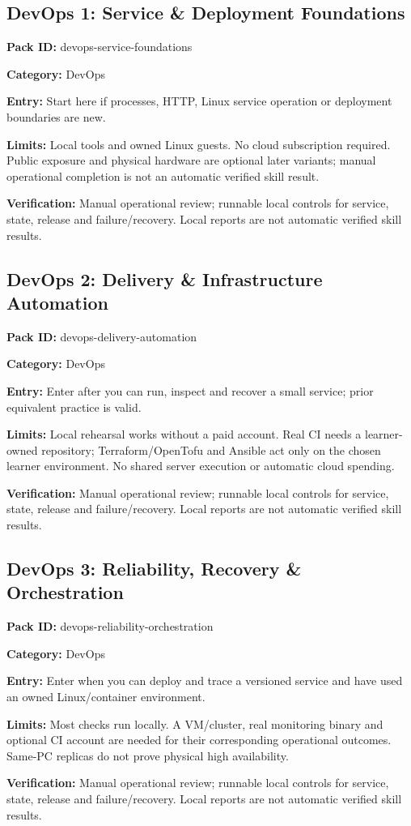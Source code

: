 \subsection{DevOps 1: Service \& Deployment Foundations}
\noindent\textbf{Pack ID:} devops-service-foundations\par
\noindent\textbf{Category:} DevOps\par
\noindent\textbf{Entry:} Start here if processes, HTTP, Linux service operation or deployment boundaries are new.\par
\noindent\textbf{Limits:} Local tools and owned Linux guests. No cloud subscription required. Public exposure and physical hardware are optional later variants; manual operational completion is not an automatic verified skill result.\par
\noindent\textbf{Verification:} Manual operational review; runnable local controls for service, state, release and failure/recovery. Local reports are not automatic verified skill results.\par
\subsection{DevOps 2: Delivery \& Infrastructure Automation}
\noindent\textbf{Pack ID:} devops-delivery-automation\par
\noindent\textbf{Category:} DevOps\par
\noindent\textbf{Entry:} Enter after you can run, inspect and recover a small service; prior equivalent practice is valid.\par
\noindent\textbf{Limits:} Local rehearsal works without a paid account. Real CI needs a learner-owned repository; Terraform/OpenTofu and Ansible act only on the chosen learner environment. No shared server execution or automatic cloud spending.\par
\noindent\textbf{Verification:} Manual operational review; runnable local controls for service, state, release and failure/recovery. Local reports are not automatic verified skill results.\par
\subsection{DevOps 3: Reliability, Recovery \& Orchestration}
\noindent\textbf{Pack ID:} devops-reliability-orchestration\par
\noindent\textbf{Category:} DevOps\par
\noindent\textbf{Entry:} Enter when you can deploy and trace a versioned service and have used an owned Linux/container environment.\par
\noindent\textbf{Limits:} Most checks run locally. A VM/cluster, real monitoring binary and optional CI account are needed for their corresponding operational outcomes. Same-PC replicas do not prove physical high availability.\par
\noindent\textbf{Verification:} Manual operational review; runnable local controls for service, state, release and failure/recovery. Local reports are not automatic verified skill results.\par
